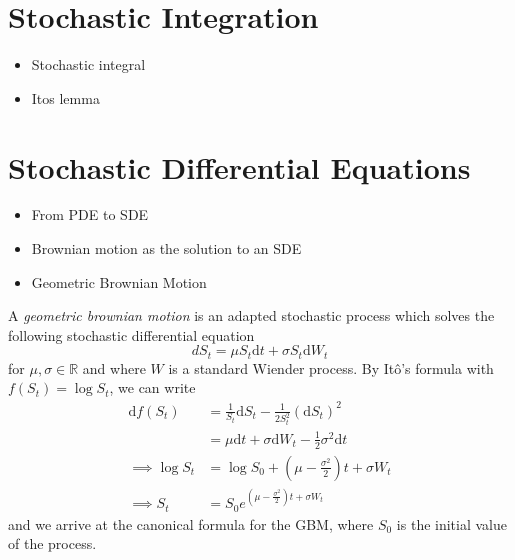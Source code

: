 \begin{definition}
    
\end{definition}

\begin{definition}
    
\end{definition}

\begin{definition}
    
\end{definition}


\section{Stochastic Integration}
\begin{itemize}
    \item Stochastic integral
    \item Itos lemma
\end{itemize}

\section{Stochastic Differential Equations}
\begin{itemize}
    \item From PDE to SDE
    \item Brownian motion as the solution to an SDE
    \item Geometric Brownian Motion
\end{itemize}
\begin{definition}
    A \emph{geometric brownian motion} is an adapted stochastic process which solves the following
    stochastic differential equation
    \begin{equation}
        dS_t=\mu S_t\mathrm dt + \sigma S_t\mathrm dW_t
    \end{equation}
    for $\mu,\sigma\in\mathbb{R}$ and where $W$ is a standard Wiender process.
    By It\^{o}'s formula with $f(S_t)=\log S_t$, we can write
    \begin{align*}
        \mathrm df(S_t)&=\frac{1}{S_t}\mathrm dS_t-\frac{1}{2S_t^2}(\mathrm dS_t)^2\\
        &=\mu\mathrm dt+\sigma\mathrm dW_t-\frac{1}{2}\sigma^2\mathrm dt\\
        \implies \log S_t&=\log S_0+\left(\mu-\frac{\sigma^2}{2}\right)t+\sigma W_t\\
        \implies S_t&=S_0e^{\left(\mu-\frac{\sigma^2}{2}\right)t+\sigma W_t}
    \end{align*}
    and we arrive at the canonical formula for the GBM, where $S_0$ is the initial value of the process.
\end{definition}
